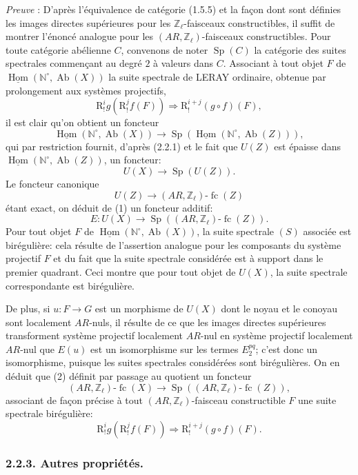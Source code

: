 \documentclass[11pt]{article}
\DeclareMathOperator{\Hom}{Hom}
\providecommand{\uHom}{\underline{\Hom}}
\providecommand{\Hom}{\operatorname{Hom}}
\providecommand{\Sp}{\operatorname{Sp}}
\providecommand{\Ab}{\operatorname{Ab}}
\providecommand{\fc}{\operatorname{fc}}
\providecommand{\Ab}{\operatorname{Ab}}
\providecommand{\Hom}{\operatorname{Hom}}
\begin{document}
\emph{Preuve} : D'après l'équivalence de catégorie (1.5.5) et la façon dont sont définies les images directes supérieures pour les \(\mathbb Z_\ell\)-faisceaux constructibles, il suffit de montrer l'énoncé analogue pour les \((AR,\mathbb Z_\ell)\)-faisceaux constructibles. Pour toute catégorie abélienne \(C\), convenons de noter \(\Sp(C)\) 
la
catégorie des suites spectrales commençant au degré \(2\) à valeurs dans \(C\). Associant à tout objet \(F\) de \(\uHom(\mathbb N^\circ,\Ab(X))\) la suite spectrale de LERAY ordinaire, obtenue par prolongement aux systèmes projectifs,
\[
\mathrm{R}^i_! g(\mathrm{R}^j_! f(F))\Longrightarrow \mathrm{R}^{i+j}_!(g\circ f)(F),
\tag{S}
\]
il est clair qu'on obtient un foncteur
\[
\uHom(\mathbb N^\circ,\Ab(X))\longrightarrow \Sp(\uHom(\mathbb N^\circ,\Ab(Z))),
\]
qui par restriction fournit, d'après (2.2.1) et le fait que \(U(Z)\) est épaisse dans \(\uHom(\mathbb N^\circ,\Ab(Z))\), un foncteur:
\[
U(X)\longrightarrow \Sp(U(Z)).
\tag{1}
\]
Le foncteur canonique
\[
U(Z)\longrightarrow (AR,\mathbb Z_\ell)\text{-}\fc(Z)
\]
étant exact, on déduit de (1) un foncteur additif:
\[
E:U(X)\longrightarrow \Sp((AR,\mathbb Z_\ell)\text{-}\fc(Z)).
\tag{2}
\]
Pour tout objet \(F\) de \(\uHom(\mathbb N^\circ,\Ab(X))\), la suite spectrale \((S)\) associée est birégulière: cela résulte de l'assertion analogue pour les composants du système projectif \(F\) et du fait que la suite spectrale considérée est à support dans le premier quadrant. Ceci montre que pour tout objet de \(U(X)\), la suite spectrale correspondante est birégulière.

De plus, si \(u:F\to G\) est un morphisme de \(U(X)\) dont le noyau et le conoyau sont localement \(AR\)-nuls, il résulte de ce que les images directes supérieures transforment système projectif localement \(AR\)-nul en système projectif localement \(AR\)-nul que \(E(u)\) est un isomorphisme sur les termes \(E_2^{pq}\); c'est donc un isomorphisme, puisque les suites spectrales considérées sont birégulières. On en déduit que (2) définit par passage au quotient un foncteur
\[
(AR,\mathbb Z_\ell)\text{-}\fc(X)
\longrightarrow \Sp((AR,\mathbb Z_\ell)\text{-}\fc(Z)),
\tag{3}
\]
associant de façon précise à tout \((AR,\mathbb Z_\ell)\)-faisceau constructible \(F\) une suite spectrale birégulière:
\[
\mathrm{R}^i_!g(\mathrm{R}^j_!f(F))\Longrightarrow \mathrm{R}^{i+j}_!(g\circ f)(F).
\]

\subsubsection*{2.2.3. Autres propriétés.}
\end{document}
